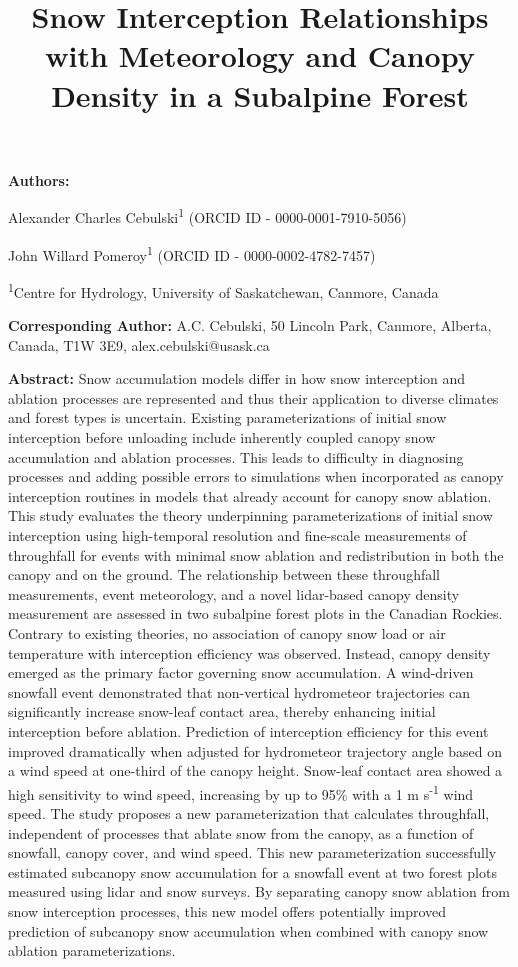 \documentclass[
  letterpaper,
  DIV=11,
  numbers=noendperiod]{scrartcl}
\title{Snow Interception Relationships with Meteorology and Canopy
Density in a Subalpine Forest}
\author{}
\date{}
\begin{document}
\maketitle



\textbf{Authors:}

Alexander Charles Cebulski\textsuperscript{1} (ORCID ID -
0000-0001-7910-5056)

John Willard Pomeroy\textsuperscript{1} (ORCID ID - 0000-0002-4782-7457)

\textsuperscript{1}Centre for Hydrology, University of Saskatchewan,
Canmore, Canada

\textbf{Corresponding Author:} A.C. Cebulski, 50 Lincoln Park, Canmore,
Alberta, Canada, T1W 3E9, alex.cebulski@usask.ca

\textbf{Abstract:} Snow accumulation models differ in how snow
interception and ablation processes are represented and thus their
application to diverse climates and forest types is uncertain. Existing
parameterizations of initial snow interception before unloading include
inherently coupled canopy snow accumulation and ablation processes. This
leads to difficulty in diagnosing processes and adding possible errors
to simulations when incorporated as canopy interception routines in
models that already account for canopy snow ablation. This study
evaluates the theory underpinning parameterizations of initial snow
interception using high-temporal resolution and fine-scale measurements
of throughfall for events with minimal snow ablation and redistribution
in both the canopy and on the ground. The relationship between these
throughfall measurements, event meteorology, and a novel lidar-based
canopy density measurement are assessed in two subalpine forest plots in
the Canadian Rockies. Contrary to existing theories, no association of
canopy snow load or air temperature with interception efficiency was
observed. Instead, canopy density emerged as the primary factor
governing snow accumulation. A wind-driven snowfall event demonstrated
that non-vertical hydrometeor trajectories can significantly increase
snow-leaf contact area, thereby enhancing initial interception before
ablation. Prediction of interception efficiency for this event improved
dramatically when adjusted for hydrometeor trajectory angle based on a
wind speed at one-third of the canopy height. Snow-leaf contact area
showed a high sensitivity to wind speed, increasing by up to 95\% with a
1 m s\textsuperscript{-1} wind speed. The study proposes a new
parameterization that calculates throughfall, independent of processes
that ablate snow from the canopy, as a function of snowfall, canopy
cover, and wind speed. This new parameterization successfully estimated
subcanopy snow accumulation for a snowfall event at two forest plots
measured using lidar and snow surveys. By separating canopy snow
ablation from snow interception processes, this new model offers
potentially improved prediction of subcanopy snow accumulation when
combined with canopy snow ablation parameterizations.
\end{document}
